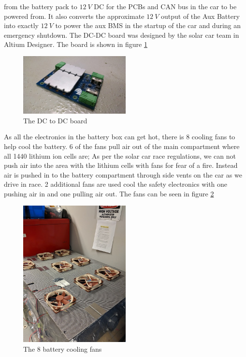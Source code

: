 \documentclass[titlepage]{article}
\begin{document}
    from the battery pack to $12\ V$ DC for the PCBs and CAN bus in the
    car to be powered from. It also converts the approximate $12\ V$
    output of the Aux Battery into exactly $12\ V$ to power the aux BMS
    in the startup of the car and during an emergency shutdown. The
    DC-DC board was designed by the solar car team in Altium Designer.
    The board is shown in figure \ref{fig:DCDC}
    \begin{figure}[H]
        \centering
        \includegraphics[width=0.5\textwidth]{images/dc-dc_board.jpeg}
        \caption{The DC to DC board}
        \label{fig:DCDC}
    \end{figure}
    \par As all the electronics in the battery box can get hot, there is
    8 cooling fans to help cool the battery. 6 of the fans pull air out
    of the main compartment where all 1440 lithium ion cells are; As per
    the solar car race regulations, we can not push air into the area
    with the lithium cells with fans for fear of a fire. Instead air is
    pushed in to the battery compartment through side vents on the car
    as we drive in race. 2 additional fans are used cool the safety
    electronics with one pushing air in and one pulling air out. The
    fans can be seen in figure \ref{fig:fans}
    \begin{figure}[H]
        \centering
        \includegraphics[width=0.5\textwidth]{images/fans.jpg}
        \caption{The 8 battery cooling fans}
        \label{fig:fans}
    \end{figure}
\end{document}
